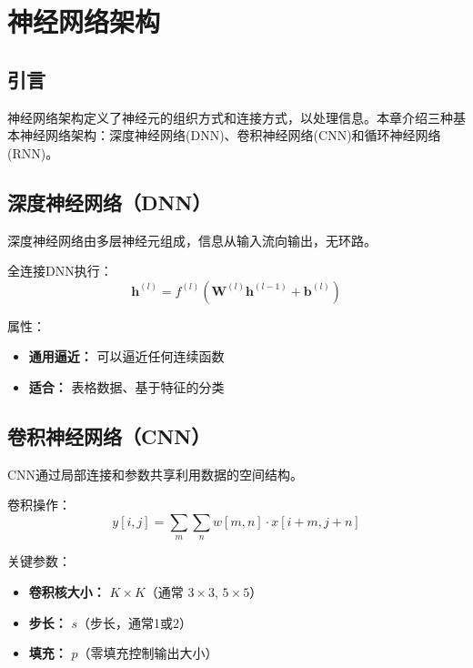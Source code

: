 %

\clearpage
\cleardoublepage

\chapter{神经网络架构}

\section{引言}

神经网络架构定义了神经元的组织方式和连接方式，以处理信息。本章介绍三种基本神经网络架构：深度神经网络(DNN)、卷积神经网络(CNN)和循环神经网络(RNN)。

\section{深度神经网络（DNN）}

深度神经网络由多层神经元组成，信息从输入流向输出，无环路。

全连接DNN执行：
\begin{equation}
\mathbf{h}^{(l)} = f^{(l)}(\mathbf{W}^{(l)}\mathbf{h}^{(l-1)} + \mathbf{b}^{(l)})
\end{equation}

属性：
\begin{itemize}
    \item \textbf{通用逼近：} 可以逼近任何连续函数
    \item \textbf{适合：} 表格数据、基于特征的分类
\end{itemize}

\section{卷积神经网络（CNN）}

CNN通过局部连接和参数共享利用数据的空间结构。

卷积操作：
\begin{equation}
y[i,j] = \sum_{m}\sum_{n} w[m,n] \cdot x[i+m, j+n]
\end{equation}

关键参数：
\begin{itemize}
    \item \textbf{卷积核大小：} $K \times K$（通常 $3 \times 3$, $5 \times 5$）
    \item \textbf{步长：} $s$（步长，通常1或2）
    \item \textbf{填充：} $p$（零填充控制输出大小）
\end{itemize}

